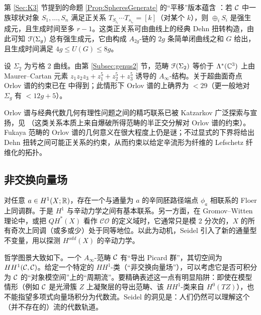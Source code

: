 
\begin{Example} 第 \ref{Sec:K3} 节提到的命题 \ref{Prop:SpheresGenerate} 的“平移”版本蕴含 \cite{BallardEtAl}：若 $\mathcal{C}$ 中一族球状对象 $S_1,\ldots, S_n$ 满足正关系 $T_{S_{i_1}}\cdots T_{s_{i_r}} = [k]$（对某个 $k$），则 $\oplus_i S_i$ 是强生成元，且生成时间至多 $r-1$。这类正关系可由曲线上的经典 Dehn 扭转构造，由此可知 $\EuScript{F}(\Sigma_g)$ 总有强生成元，它由构成 $A_{2g}$-链的 $2g$ 条简单闭曲线之和 $G$ 给出，且生成时间满足 $4g \leq U(G) \leq 8g$。\end{Example}


\begin{Example}
设 $\Sigma_2$ 为亏格 2 曲线。由第 \ref{Subsec:genus2} 节，范畴 $\EuScript{F}(\Sigma_2)$ 等价于 $\Lambda^*(\mathbb{C}^3)$ 上由 Maurer--Cartan 元素 $z_1z_2z_3 + z_1^5+z_2^5+z_3^5$ 诱导的 $A_{\infty}$-结构。关于超曲面奇点 Orlov 谱的约束已在 \cite{BallardEtAl} 中得到；此情形下 Orlov 谱的上确界为 $< 29$（更一般地对 $\Sigma_g$ 有 $<12g+5$）。
\end{Example}

Orlov 谱与经典代数几何有理性问题之间的精巧联系已被 Katzarkov 广泛探索与宣扬，见 \cite{Katzarkov,BallardEtAl}（这类关系本质上来自爆破所得范畴的半正交分解对 Orlov 谱的约束）。Fukaya 范畴的 Orlov 谱的几何意义在很大程度上仍是谜；不过显式的下界将给出 Dehn 扭转之间可能正关系的约束，从而约束以给定辛流形为纤维的 Lefschetz 纤维化的拓扑。

\subsection{非交换向量场} 对任意 $a \in H^1(X;\mathbb{R})$，存在一个与通量为 $a$ 的辛同胚路径端点 $\phi_a$ 相联系的 Floer 上同调群。于是 $H^1$ 与辛动力学之间有基本联系。另一方面，在 Gromov--Witten 理论中，或把 $QH^*(X)$ 看作 $\mathcal{CO}$ 的定义域时，它通常只是模 2 分次的，$X$ 的所有奇次上同调（或多或少）处于同等地位。以此为动机，Seidel 引入了新的通量型不变量，用以探测 $H^{odd}(X)$ 的辛动力学。

哲学图景大致如下。一个 $A_{\infty}$-范畴 $\mathcal{C}$ 有“导出 Picard 群”，其切空间为 $HH^1(\mathcal{C},\mathcal{C})$。给定一个特定的 $HH^1$-类（“非交换向量场”），可以考虑它是否可积分为 $\mathcal{C}$ 的“对象模空间”上的“周期流”。要精确表述这一点有明显陷阱：即使在模型情形（例如 $\mathcal{C}$ 是光滑簇 $Z$ 上凝聚层的导出范畴、该 $HH^1$-类来自 $H^0(TZ)$），也不能指望多项式向量场积分为代数流。Seidel 的洞见是：人们仍然可以理解这个（并不存在的）流的代数轨道。

